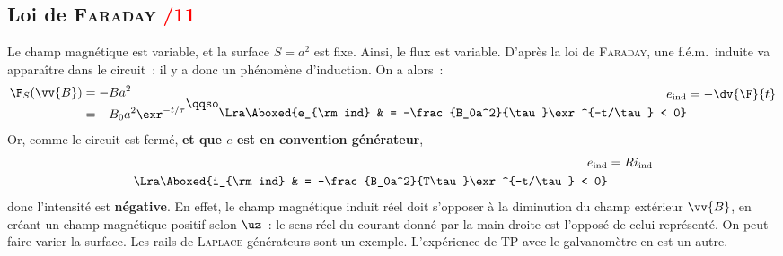 \documentclass[11pt]{book}
\begin{document}
{	\subsection{Loi de \textsc{Faraday} \hfill \textcolor{red}{/11}}
	\label{ssec:faraday}
	\begin{enumerate}
		 Le champ magnétique est variable, et la surface $S = a^2$ est fixe.
		Ainsi, le flux est variable. D'après la loi de \textsc{Faraday}, une f.é.m.\
		induite va apparaître dans le circuit~: il y a donc un phénomène
		d'induction.
		On a alors~:
		\vspace{-10pt}
		\begin{gather*}
			\begin{aligned}{}
				\F_S(\vv{B}) & = -Ba^2
				\\
				             & = -B_0a^2\exr^{-t/\tau}
			\end{aligned}
			\qqso
			\begin{aligned}{}
				e_{\rm ind}         & = -\dv{\F}{t}
				\\\Lra
				\Aboxed{e_{\rm ind} & = -\frac{B_0a^2}{\tau}\exr^{-t/\tau} < 0}
			\end{aligned}
		\end{gather*}
		Or, comme le circuit est fermé, \textbf{et que $e$ est en convention
			générateur},
		\vspace{-10pt}
		\begin{align*}
			e_{\rm ind}         & = Ri_{\rm ind}
			\\\Lra
			\Aboxed{i_{\rm ind} & = -\frac{B_0a^2}{T\tau}\exr^{-t/\tau} < 0}
		\end{align*}
		donc l'intensité est \textbf{négative}.
		 En effet, le champ magnétique induit
		réel doit s'opposer à la diminution du champ extérieur $\vv{B}$, en créant un
		champ magnétique positif selon $\uz$~: le sens réel du courant donné par la
		main droite est l'opposé de celui représenté.
		 On peut faire varier la surface. Les rails de \textsc{Laplace}
		générateurs sont un exemple. L'expérience de TP avec le galvanomètre en est
		un autre.
	\end{enumerate}
}
\end{document}

